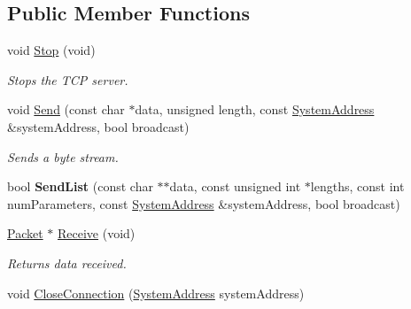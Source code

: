 \subsection*{Public Member Functions}
\begin{DoxyCompactItemize}
\item 
\hypertarget{class_rak_net_1_1_packetized_t_c_p_a4c6fd527eb8afde7ba3517a8fc7ad405}{void \hyperlink{class_rak_net_1_1_packetized_t_c_p_a4c6fd527eb8afde7ba3517a8fc7ad405}{Stop} (void)}\label{class_rak_net_1_1_packetized_t_c_p_a4c6fd527eb8afde7ba3517a8fc7ad405}

\begin{DoxyCompactList}\small\item\em Stops the T\-C\-P server. \end{DoxyCompactList}\item 
\hypertarget{class_rak_net_1_1_packetized_t_c_p_aa50424e1b9295b505dfc0cb97a038407}{void \hyperlink{class_rak_net_1_1_packetized_t_c_p_aa50424e1b9295b505dfc0cb97a038407}{Send} (const char $\ast$data, unsigned length, const \hyperlink{struct_rak_net_1_1_system_address}{System\-Address} \&system\-Address, bool broadcast)}\label{class_rak_net_1_1_packetized_t_c_p_aa50424e1b9295b505dfc0cb97a038407}

\begin{DoxyCompactList}\small\item\em Sends a byte stream. \end{DoxyCompactList}\item 
\hypertarget{class_rak_net_1_1_packetized_t_c_p_a6715fabbf02fd9a44246b60c73e39656}{bool {\bfseries Send\-List} (const char $\ast$$\ast$data, const unsigned int $\ast$lengths, const int num\-Parameters, const \hyperlink{struct_rak_net_1_1_system_address}{System\-Address} \&system\-Address, bool broadcast)}\label{class_rak_net_1_1_packetized_t_c_p_a6715fabbf02fd9a44246b60c73e39656}

\item 
\hypertarget{class_rak_net_1_1_packetized_t_c_p_a347c90e6cfbcdfb780dd0cb91a107b0c}{\hyperlink{struct_rak_net_1_1_packet}{Packet} $\ast$ \hyperlink{class_rak_net_1_1_packetized_t_c_p_a347c90e6cfbcdfb780dd0cb91a107b0c}{Receive} (void)}\label{class_rak_net_1_1_packetized_t_c_p_a347c90e6cfbcdfb780dd0cb91a107b0c}

\begin{DoxyCompactList}\small\item\em Returns data received. \end{DoxyCompactList}\item 
\hypertarget{class_rak_net_1_1_packetized_t_c_p_a84f756f69de4ad710b9a9acf4b8a34e1}{void \hyperlink{class_rak_net_1_1_packetized_t_c_p_a84f756f69de4ad710b9a9acf4b8a34e1}{Close\-Connection} (\hyperlink{struct_rak_net_1_1_system_address}{System\-Address} system\-Address)}\label{class_rak_net_1_1_packetized_t_c_p_a84f756f69de4ad710b9a9acf4b8a34e1}


\end{DoxyCompactItemize}
